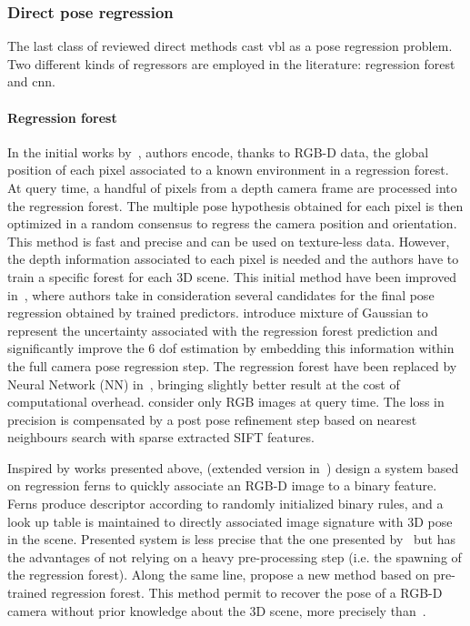 \subsubsection{Direct pose regression}
\label{subsubsec:pose_regression}
The last class of reviewed direct methods cast \ac{vbl} as a pose regression problem. Two different kinds of regressors are employed in the literature: regression forest and \ac{cnn}.

\paragraph{Regression forest}
In the initial works by~\citet{Shotton2013}, authors encode, thanks to RGB-D data, the global position of each pixel associated to a known environment in a regression forest. At query time, a handful of pixels from a depth camera frame are processed into the regression forest. The multiple pose hypothesis obtained for each pixel is then optimized in a random consensus to regress the camera position and orientation. This method is fast and precise and can be used on texture-less data. However, the depth information associated to each pixel is needed and the authors have to train a specific forest for each 3D scene. This initial method have been improved in~\citep{Guzman-rivera2014}, where authors take in consideration several candidates for the final pose regression obtained by trained predictors. \citet{Valentin2015} introduce mixture of Gaussian to represent the uncertainty associated with the regression forest prediction and significantly improve the 6 \ac{dof} estimation by embedding this information within the full camera pose regression step. The regression forest have been replaced by Neural Network (NN) in~\citep{Massiceti2016}, bringing slightly better result at the cost of computational overhead. \citet{Meng2016} consider only RGB images at query time. The loss in precision is compensated by a post pose refinement step based on nearest neighbours search with sparse extracted SIFT features.

Inspired by works presented above, \citet{Glocker2013} (extended version in~\citep{Glocker2015}) design a system based on regression ferns to quickly associate an RGB-D image to a binary feature. Ferns produce descriptor according to randomly initialized binary rules, and a look up table is maintained to directly associated image signature with 3D pose in the scene. Presented system is less precise that the one presented by~\citet{Shotton2013} but has the advantages of not relying on a heavy pre-processing step (i.e. the spawning of the regression forest). Along the same line, \citet{Cavallari} propose a new method based on pre-trained regression forest. This method permit to recover the pose of a RGB-D camera without prior knowledge about the 3D scene, more precisely than~\citet{Glocker2013,Glocker2015}.


